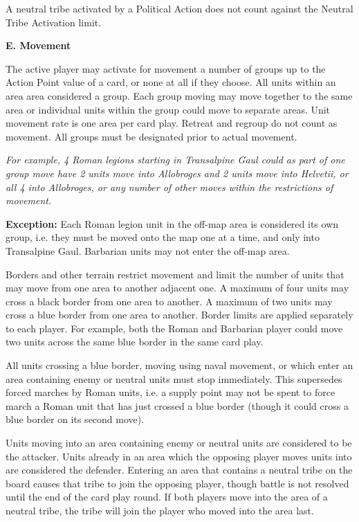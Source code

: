 A neutral tribe activated by a Political Action does not count against the Neutral Tribe Activation limit.

\label{movement}\textbf{E. Movement}
\par
The active player may activate for movement a number of groups up to the Action Point value of a card, or none at all if they choose. All units within an area area considered a group. Each group moving may move together to the same area or individual units within the group could move to separate areas. Unit movement rate is one area per card play. Retreat and regroup do not count as movement. All groups must be designated prior to actual movement.

\textit{For example, 4 Roman legions starting in Transalpine Gaul could as part of one group move have 2 units move into Allobroges and 2 units move into Helvetii, or all 4 into Allobroges, or any number of other moves within the restrictions of movement.}

\textbf{Exception:} Each Roman legion unit in the off-map area is considered its own group, i.e. they must be moved onto the map one at a time, and only into Transalpine Gaul. Barbarian units may not enter the off-map area.
\par
Borders and other terrain restrict movement and limit the number of units that may move from one area to another adjacent one. A maximum of four units may cross a black border from one area to another. A maximum of two units may cross a blue border from one area to another. Border limits are applied separately to each player. For example, both the Roman and Barbarian player could move two units across the same blue border in the same card play.

All units crossing a blue border, moving using naval movement, or which enter an area containing enemy or neutral units must stop immediately. This supersedes forced marches by Roman units, i.e. a supply point may not be spent to force march a Roman unit that has just crossed a blue border (though it could cross a blue border on its second move).

Units moving into an area containing enemy or neutral units are considered to be the attacker. Units already in an area which the opposing player moves units into are considered the defender. Entering an area that contains a neutral tribe on the board causes that tribe to join the opposing player, though battle is not resolved until the end of the card play round. If both players move into the area of a neutral tribe, the tribe will join the player who moved into the area last.

